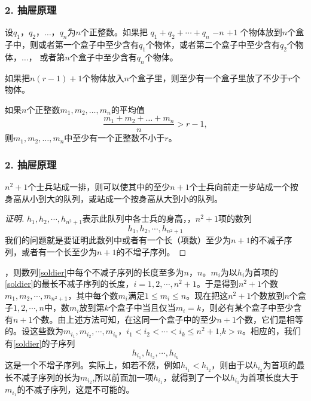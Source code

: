 \documentclass{beamer}
\begin{document}
\begin{CJK*}{UTF8}{gbsn}
\begin{frame}
  \frametitle{2. 抽屉原理}
  \begin{Thm}[抽屉原理的强形式]
    设$q_1$，$q_2$，$\ldots$，$q_n$为$n$个正整数。如果把 $q_1 + q_2 + \cdots + q_n$  $- n$ $ + 1$ 个物体放到$n$个盒子中，则或者第一个盒子中至少含有$q_1$个物体，或者第二个盒子中至少含有$q_2$个物体，$\ldots$，
    或者第$n$个盒子中至少含有$q_n$个物体。
  \end{Thm}\pause
  \begin{Cor}
    如果把$n(r-1) + 1$个物体放入$n$个盒子里，则至少有一个盒子里放了不少于$r$个物体。
  \end{Cor}\pause
  \begin{Cor}
    如果$n$个正整数$m_1, m_2, \ldots, m_n$的平均值\[\frac{m_1 + m_2 + \ldots + m_n}{n} > r - 1,\] 则$m_1, m_2, \ldots, m_n$中至少有一个正整数不小于$r$。
  \end{Cor}
\end{frame}

\begin{frame}
    \frametitle{2. 抽屉原理}
  \begin{Ex}
    $n^2+1$个士兵站成一排，则可以使其中的至少$n+1$个士兵向前走一步站成一个按身高从小到大的队列，或站成一个按身高从大到小的队列。
  \end{Ex}
  \begin{proof}[证明]
    \justifying\let\raggedright\justifying
    $h_1, h_2, \cdots, h_{n^2+1}$表示此队列中各士兵的身高，，$n^2+1$项的数列
    \begin{equation}\label{soldier}
      h_1,h_2,\cdots, h_{n^2+1}
    \end{equation}
    \pause 我们的问题就是要证明此数列中或者有一个长（项数）至少为$n+1$的不减子序列，\pause 或者有一个长至少为$n+1$的不增子序列。

      \end{proof}
\end{frame}
\begin{frame}
  \justifying\let\raggedright\justifying
  ，\pause 则数列\eqref{soldier}中每个不减子序列的长度至多为$n$，$n$。$m_i$为以$h_i$为首项的\eqref{soldier}的最长不减子序列的长度，\pause $i=1,2,\cdots, n^2+1$。\pause 于是得到$n^2+1$个数$m_1,m_2,\cdots,m_{n^2+1}$，\pause 其中每个数$m_i$满足$1\leq m_i \leq n$。\pause 现在把这$n^2+1$个数放到$n$个盒子$1,2,\cdots,n$中，\pause 数$m_i$放到第$k$个盒子中当且仅当$m_i=k$，\pause 则必有某个盒子中至少含有$n+1$个数。\pause 由上述方法可知，\pause 在这同一个盒子中的至少$n+1$个数，\pause 它们是相等的。\pause 设这些数为$m_{i_1},m_{i_2},\cdots, m_{i_k}$，\pause $i_1<i_2<\cdots<i_k\leq n^2+1$,$k>n$。\pause 相应的，\pause 我们有\eqref{soldier}的子序列
  \begin{equation}\label{subseq}
  h_{i_1}, h_{i_2}, \cdots, h_{i_k}      
  \end{equation}
 \pause  这是一个不增子序列。\pause 实际上，\pause 如若不然，\pause 例如$h_{i_1} < h_{i_2}$，\pause 则由于以$h_{i_2}$为首项的最长不减子序列的长为$m_{i_2}$,\pause 所以前面加一项$h_{i_1}$，\pause 就得到了一个以$h_{i_1}$为首项长度大于$m_{i_1}$的不减子序列，\pause 这是不可能的。


\end{frame}
\end{CJK*}
\end{document}
